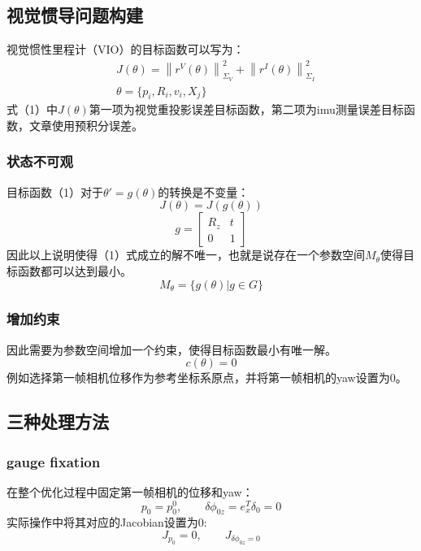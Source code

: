 \documentclass[UTF8]{ctexart}
\begin{document}
\subsection{视觉惯导问题构建}
\indent 视觉惯性里程计（VIO）的目标函数可以写为：\\
\begin{equation}
\begin{aligned}
& J(\theta)=\left\|r^V(\theta)\right\|^2_{\Sigma_V} + \left\|r^I(\theta)\right\|^2_{\Sigma_I} \\
& \theta = \{p_i,R_i,v_i,X_j\}
\end{aligned}
\end{equation}
\indent 式（1）中$J(\theta)$第一项为视觉重投影误差目标函数，第二项为imu测量误差目标函数，文章使用预积分误差。
\subsubsection{状态不可观}
\indent 目标函数（1）对于$\theta'=g(\theta)$的转换是不变量：
\begin{equation}
J(\theta) = J(g(\theta))   
\end{equation}
\begin{equation}
g=\begin{bmatrix}
R_z & t\\
0 & 1    
\end{bmatrix}  
\end{equation}
\indent 因此以上说明使得（1）式成立的解不唯一，也就是说存在一个参数空间$M_\theta$使得目标函数都可以达到最小。
\begin{equation}
M_\theta = \{g(\theta)|g\in G\}    
\end{equation}
\subsubsection{增加约束}
\indent 因此需要为参数空间增加一个约束，使得目标函数最小有唯一解。\\
\begin{equation}
c(\theta)= 0   
\end{equation}
\indent 例如选择第一帧相机位移作为参考坐标系原点，并将第一帧相机的yaw设置为0。
\subsection{三种处理方法}
\subsubsection{gauge fixation}
\indent 在整个优化过程中固定第一帧相机的位移和yaw：
\begin{equation}
p_0 = p_0^0,\qquad \delta \phi_{0z} = e_x^T\delta_0=0
\end{equation}
\indent 实际操作中将其对应的Jacobian设置为0:
\begin{equation}
J_{p_0}=0, \qquad J_{\delta \phi_{0z}=0}
\end{equation}
\end{document}
